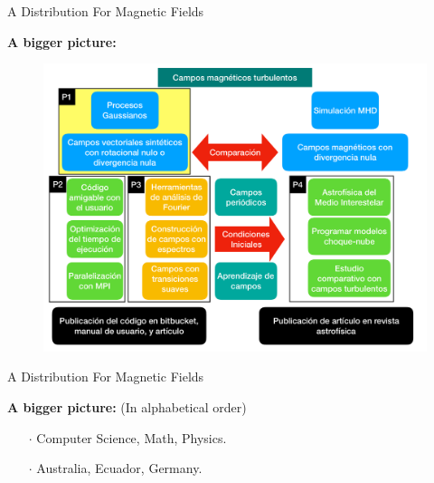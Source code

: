 \documentclass{beamer}
\begin{document}
\begin{frame}{A Distribution For Magnetic Fields}

  \textbf{A bigger picture:}
  \begin{figure}
    \includegraphics[width=\linewidth]{plots/Sub-proyectos.pdf}
  \end{figure}

\end{frame}

\begin{frame}{A Distribution For Magnetic Fields}

  \textbf{A bigger picture:} (In alphabetical order)

  \vspace{1em}

  \begin{itemize}
    \item[$\cdot$] Computer Science, Math, Physics.
    \item[$\cdot$] Australia, Ecuador, Germany.
  \end{itemize}
\end{frame}
\end{document}
